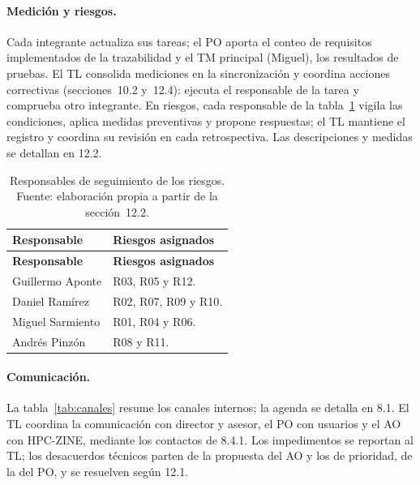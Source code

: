 \paragraph{Medición y riesgos.} Cada integrante actualiza sus tareas; el PO aporta el conteo de requisitos implementados de la trazabilidad y el TM principal (Miguel), los resultados de pruebas. El TL consolida mediciones en la sincronización y coordina acciones correctivas (secciones~10.2 y~12.4): ejecuta el responsable de la tarea y comprueba otro integrante. En riesgos, cada responsable de la tabla~\ref{tab:resp-riesgos} vigila las condiciones, aplica medidas preventivas y propone respuestas; el TL mantiene el registro y coordina su revisión en cada retrospectiva. Las descripciones y medidas se detallan en 12.2.

\begin{longtable}{|p{}|p{}|}
\caption{Responsables de seguimiento de los riesgos. Fuente: elaboración propia a partir de la sección~12.2.}\label{tab:resp-riesgos}\\\hline
\textbf{Responsable} & \textbf{Riesgos asignados}\tabularnewline\hline
\endfirsthead
\hline
\textbf{Responsable} & \textbf{Riesgos asignados}\tabularnewline\hline
\endhead
Guillermo Aponte & R03, R05 y R12.\tabularnewline\hline
Daniel Ramírez & R02, R07, R09 y R10.\tabularnewline\hline
Miguel Sarmiento & R01, R04 y R06.\tabularnewline\hline
Andrés Pinzón & R08 y R11.\tabularnewline\hline
\end{longtable}

\paragraph{Comunicación.} La tabla~\ref{tab:canales} resume los canales internos; la agenda se detalla en 8.1. El TL coordina la comunicación con director y asesor, el PO con usuarios y el AO con HPC-ZINE, mediante los contactos de 8.4.1. Los impedimentos se reportan al TL; los desacuerdos técnicos parten de la propuesta del AO y los de prioridad, de la del PO, y se resuelven según 12.1.

